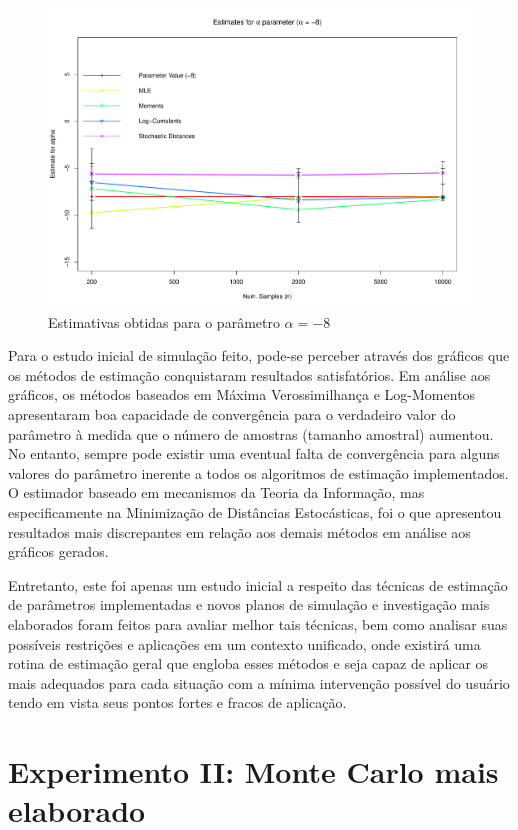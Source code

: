\begin{figure}[H]
     \centering
     \includegraphics[scale=0.5]{plots/ComparisonAlpha-8.pdf}
     \caption{Estimativas obtidas para o parâmetro $\alpha = -8$}
     \label{graf_7}
\end{figure}

Para o estudo inicial de simulação feito, pode-se perceber através dos gráficos que os métodos de estimação conquistaram resultados satisfatórios. Em análise aos gráficos, os métodos baseados em Máxima Verossimilhança e Log-Momentos apresentaram boa capacidade de convergência para o verdadeiro valor do parâmetro à medida que o número de amostras (tamanho amostral) aumentou. No entanto, sempre pode existir uma eventual falta de convergência para alguns valores do parâmetro inerente a todos os algoritmos de estimação implementados. 
O estimador baseado em mecanismos da Teoria da Informação, mas especificamente na Minimização de Distâncias Estocásticas, foi o que apresentou resultados mais discrepantes em relação aos demais métodos em análise aos gráficos gerados.

Entretanto, este foi apenas um estudo inicial a respeito das técnicas de estimação de parâmetros implementadas e  novos planos de simulação e investigação mais elaborados foram feitos para avaliar melhor tais técnicas, bem como analisar suas possíveis restrições e aplicações em um contexto unificado, onde existirá uma rotina de estimação geral que engloba esses métodos e seja capaz de aplicar os mais adequados para cada situação com a mínima intervenção possível do usuário tendo em vista seus pontos fortes e fracos de aplicação.

\section{Experimento II: Monte Carlo mais elaborado}

